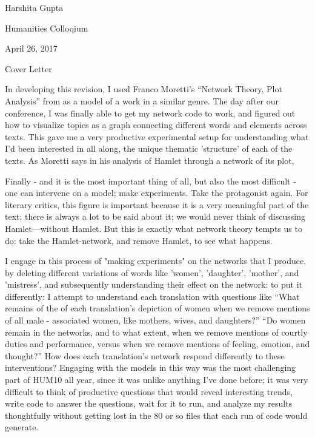 \documentclass[12pt]{article}
\newenvironment{coverletter}{\begin{center} Cover Letter \end{center}}{\newpage }
\begin{document}
\begin{flushleft}


\begin{spacing}{2.0}
Harshita Gupta

Humanities Colloqium

April 26, 2017

\begin{coverletter}
\singlespacing
In developing this revision, I used Franco Moretti's ``Network Theory, Plot Analysis'' from  as a model of a work in a similar genre. The day after our conference, I was finally able to get my network code to work, and figured out how to visualize topics as a graph connecting different words and elements across texts. This gave me a very productive experimental setup for understanding what I'd been interested in all along, the unique thematic 'structure' of each of the texts. As Moretti says in his analysis of Hamlet through a network of its plot,

\begin{displayquote}
Finally - and it is the most important thing of all, but also the most difficult - one can intervene on a model; make experiments. Take the protagonist again. For literary critics, this figure is important because it is a very meaningful part of the text; there is always a lot to be said about it; we would never think of discussing Hamlet—without Hamlet. But this is exactly what network theory tempts us to do: take the Hamlet-network, and remove Hamlet, to see what happens.
\end{displayquote}

I engage in this process of "making experiments" on the networks that I produce, by deleting different variations of words like 'women', 'daughter', 'mother', and 'mistress', and subsequently understanding their effect on the network: to put it differently: I attempt to understand each translation with questions like ``What remains of the of each translation's depiction of women when we remove mentions of all male - associated women, like mothers, wives, and daughters?'' ``Do women remain in the networks, and to what extent, when we remove mentions of courtly duties and performance, versus when we remove mentions of feeling, emotion, and thought?'' How does each translation's network respond differently to these interventions? Engaging with the models in this way was the most challenging part of HUM10 all year, since it was unlike anything I've done before; it was very difficult to think of productive questions that would reveal interesting trends, write code to answer the questions, wait for it to run, and analyze my results thoughtfully without getting lost in the 80 or so files that each run of code would generate. \linebreak


\end{coverletter}
\end{spacing}
\end{flushleft}
\end{document}
